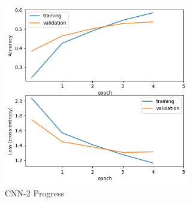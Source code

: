 \documentclass{tron}
\begin{document}
\begin{figure}[H]
	\center
	\includegraphics[height=300px]{../src_code/output/p3/progress_CNN-2.}
	\caption{CNN-2 Progress}
\end{figure}
\end{document}
